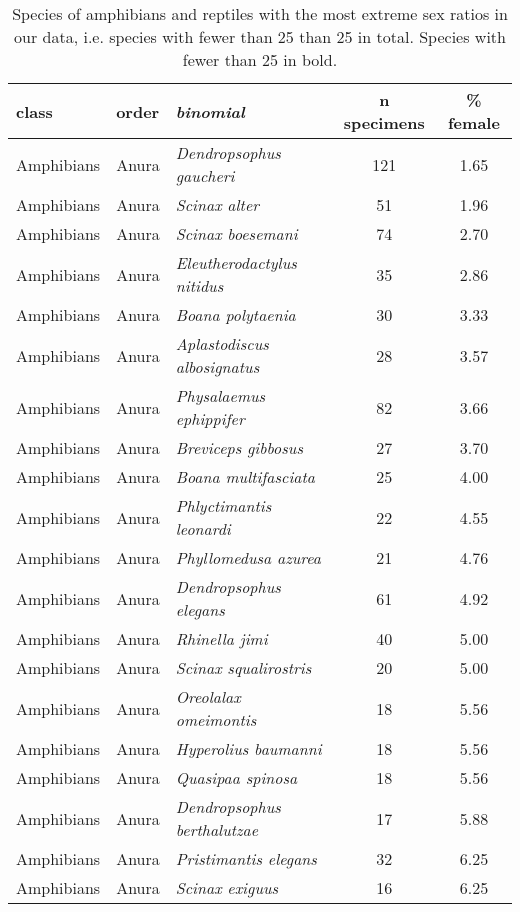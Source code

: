 \begin{longtable}{ll>{\itshape}lcc}
\caption{Species of amphibians and reptiles with the most extreme sex ratios
                  in our data, i.e. species with fewer than 25%
                  than 25%
                  in total. Species with  fewer than 25%
                  in bold.} \\ 
  \hline
class & order & binomial & n specimens & \% female \\ 
  \hline
Amphibians & Anura & Dendropsophus gaucheri & 121 & 1.65 \\ 
  Amphibians & Anura & Scinax alter &  51 & 1.96 \\ 
  Amphibians & Anura & Scinax boesemani &  74 & 2.70 \\ 
  Amphibians & Anura & Eleutherodactylus nitidus &  35 & 2.86 \\ 
  Amphibians & Anura & Boana polytaenia &  30 & 3.33 \\ 
  Amphibians & Anura & Aplastodiscus albosignatus &  28 & 3.57 \\ 
  Amphibians & Anura & Physalaemus ephippifer &  82 & 3.66 \\ 
  Amphibians & Anura & Breviceps gibbosus &  27 & 3.70 \\ 
  Amphibians & Anura & Boana multifasciata &  25 & 4.00 \\ 
  Amphibians & Anura & Phlyctimantis leonardi &  22 & 4.55 \\ 
  Amphibians & Anura & Phyllomedusa azurea &  21 & 4.76 \\ 
  Amphibians & Anura & Dendropsophus elegans &  61 & 4.92 \\ 
  Amphibians & Anura & Rhinella jimi &  40 & 5.00 \\ 
  Amphibians & Anura & Scinax squalirostris &  20 & 5.00 \\ 
  Amphibians & Anura & Oreolalax omeimontis &  18 & 5.56 \\ 
  Amphibians & Anura & Hyperolius baumanni &  18 & 5.56 \\ 
  Amphibians & Anura & Quasipaa spinosa &  18 & 5.56 \\ 
  Amphibians & Anura & Dendropsophus berthalutzae &  17 & 5.88 \\ 
  Amphibians & Anura & Pristimantis elegans &  32 & 6.25 \\ 
  Amphibians & Anura & Scinax exiguus &  16 & 6.25 \\ 

\end{longtable}
